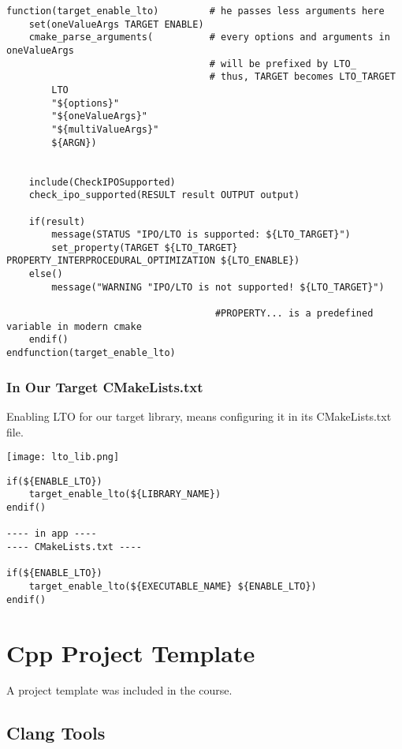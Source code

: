\begin{verbatim}
function(target_enable_lto)         # he passes less arguments here
    set(oneValueArgs TARGET ENABLE)
    cmake_parse_arguments(          # every options and arguments in oneValueArgs
                                    # will be prefixed by LTO_
                                    # thus, TARGET becomes LTO_TARGET
        LTO
        "${options}"
        "${oneValueArgs}"
        "${multiValueArgs}"
        ${ARGN})


    include(CheckIPOSupported)
    check_ipo_supported(RESULT result OUTPUT output)

    if(result) 
        message(STATUS "IPO/LTO is supported: ${LTO_TARGET}")
        set_property(TARGET ${LTO_TARGET} PROPERTY_INTERPROCEDURAL_OPTIMIZATION ${LTO_ENABLE})
    else()
        message("WARNING "IPO/LTO is not supported! ${LTO_TARGET}")

                                     #PROPERTY... is a predefined variable in modern cmake
    endif()
endfunction(target_enable_lto)
\end{verbatim}

\subsection{In Our Target CMakeLists.txt}

Enabling LTO for our target library, means configuring it in its CMakeLists.txt file.

\begin{center}
    \texttt{[image: lto\_lib.png]}
\end{center}


\begin{verbatim}
if(${ENABLE_LTO})
    target_enable_lto(${LIBRARY_NAME})
endif()

---- in app ----
---- CMakeLists.txt ----

if(${ENABLE_LTO})
    target_enable_lto(${EXECUTABLE_NAME} ${ENABLE_LTO})
endif()
\end{verbatim}

\chapter{Cpp Project Template}

A project template was included in the course. 


\section{Clang Tools}



